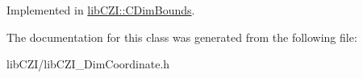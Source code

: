 Implemented in \hyperlink{classlib_c_z_i_1_1_c_dim_bounds_abf42285e28ddc4843556f88b2292c494}{lib\+C\+Z\+I\+::\+C\+Dim\+Bounds}.



The documentation for this class was generated from the following file\+:\begin{DoxyCompactItemize}
\item 
lib\+C\+Z\+I/lib\+C\+Z\+I\+\_\+\+Dim\+Coordinate.\+h\end{DoxyCompactItemize}
